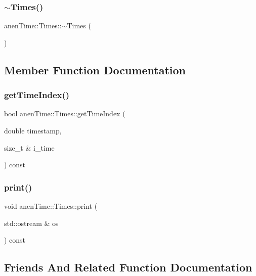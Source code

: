 \subsubsection{\texorpdfstring{$\sim$\+Times()}{~Times()}}
{\footnotesize\ttfamily anen\+Time\+::\+Times\+::$\sim$\+Times (\begin{DoxyParamCaption}{ }\end{DoxyParamCaption})\hspace{0.3cm}{\ttfamily [virtual]}}



\subsection{Member Function Documentation}
\mbox{\label{classanen_time_1_1_times_a2100e11524b814628670820204890a09}} 
\subsubsection{\texorpdfstring{get\+Time\+Index()}{getTimeIndex()}}
{\footnotesize\ttfamily bool anen\+Time\+::\+Times\+::get\+Time\+Index (\begin{DoxyParamCaption}\item[{double}]{timestamp,  }\item[{size\+\_\+t \&}]{i\+\_\+time }\end{DoxyParamCaption}) const}

\mbox{\label{classanen_time_1_1_times_aec5c8186b68d51239dbee83a7303e5d0}} 
\subsubsection{\texorpdfstring{print()}{print()}}
{\footnotesize\ttfamily void anen\+Time\+::\+Times\+::print (\begin{DoxyParamCaption}\item[{std\+::ostream \&}]{os }\end{DoxyParamCaption}) const}



\subsection{Friends And Related Function Documentation}
\mbox{\label{classanen_time_1_1_times_a0c37c7d9833e9b02d1a219555f55fe34}} 
